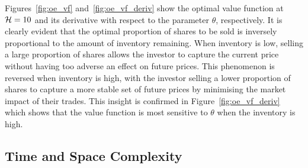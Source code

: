 Figures~\ref{fig:oe_vf} and~\ref{fig:oe_vf_deriv} show the optimal value function at {\footnotesize $ \mathcal{H} = 10 $} and its derivative with respect to the parameter {\footnotesize $ \theta$}, respectively. It is clearly evident that the optimal proportion of shares to be sold is inversely proportional to the amount of inventory remaining. When inventory is low, selling a large proportion of shares allows the investor to capture the current price without having too adverse an effect on future prices. This phenomenon is reversed when inventory is high, with the investor selling a lower proportion of shares to capture a more stable set of future prices by minimising the market impact of their trades. This insight is confirmed in Figure~\ref{fig:oe_vf_deriv} which shows that the value function is most sensitive to {\footnotesize $\theta$} when the inventory is high.

\subsection{Time and Space Complexity}

